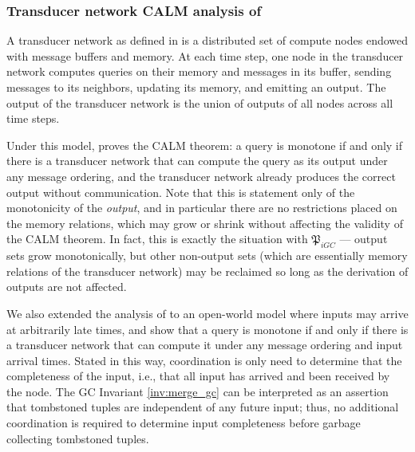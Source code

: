 


\subsubsection{Transducer network CALM analysis of \cite{ameloot2013relational}}
A transducer network as defined in \cite{ameloot2013relational} is a distributed set of compute nodes endowed with message buffers and memory.
At each time step, one node in the transducer network computes queries on their memory and messages in its buffer, sending messages to its neighbors, updating its memory, and emitting an output.
The output of the transducer network is the union of outputs of all nodes across all time steps.

Under this model, \cite{ameloot2013relational} proves the CALM theorem: a query is monotone if and only if there is a transducer network that can compute the query as its output under any message ordering, and the transducer network already produces the correct output without communication.
Note that this is statement only of the monotonicity of the \emph{output}, and in particular there are no restrictions placed on the memory relations, which may grow or shrink without affecting the validity of the CALM theorem.
In fact, this is exactly the situation with $\mathfrak{P}_{iGC}$ --- output sets grow monotonically, but other non-output sets (which are essentially memory relations of the transducer network) may be reclaimed so long as the derivation of outputs are not affected.


We also extended the analysis of \cite{ameloot2013relational} to an open-world model where inputs may arrive at arbitrarily late times, and show that a query is monotone if and only if there is a transducer network that can compute it under any message ordering and input arrival times.
Stated in this way, coordination is only need to determine that the completeness of the input, i.e., that all input has arrived and been received by the node.
The GC Invariant \ref{inv:merge_gc} can be interpreted as an assertion that tombstoned tuples are independent of any future input;
thus, no additional coordination is required to determine input completeness before garbage collecting tombstoned tuples.


